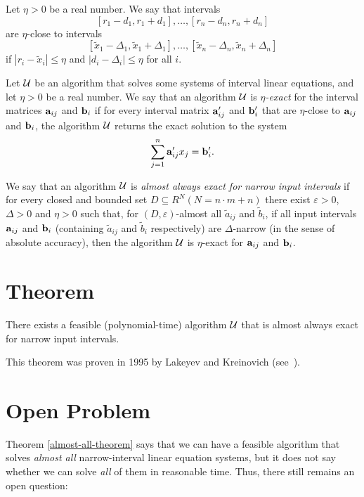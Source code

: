 \begin{definition}
{\rm Let $\eta>0$ be a real number.  We say that intervals
$$
  [r_1-d_1,r_1+d_1],\ldots,[r_n-d_n,r_n+d_n]
$$
are {$\eta$-close} to intervals
$$
  [\tilde x_1-\Delta_1,\tilde x_1+\Delta_1],\ldots,[\tilde x_n-\Delta_n,
   \tilde x_n+\Delta_n]
$$
if $|r_i-\tilde x_i|\leq\eta$ and 
$|d_i-\Delta_i|\leq\eta$ for all $i$.}
\end{definition}

\begin{definition}
{\rm Let $\cal U$ be an algorithm that solves some systems of interval linear
equations, and let $\eta>0$ be a real number.  We say that an algorithm 
$\cal U$ is {\em $\eta$-exact\/} for the interval matrices ${\bf a}_{ij}$ and
${\bf b}_i$ if for every interval matrix ${\bf a}_{ij}^\prime$ and 
${\bf b}_i^\prime$ that are $\eta$-close to ${\bf a}_{ij}$ and ${\bf b}_i$,
the algorithm $\cal U$ returns the exact solution to the system}
$$
  \sum_{j=1}^n {\bf a}_{ij}^\prime x_j = {\bf b}_i^\prime.
$$
\end{definition}

\begin{definition}
{\rm We say that an algorithm $\cal U$ is {\em almost always exact for narrow 
input intervals\/} if for every closed and bounded set $D\subseteq R^N
(N=n\cdot m+n)$ there exist $\varepsilon>0$, $\Delta>0$ and $\eta>0$ such
that, for $(D,\varepsilon)$-almost all $\tilde a_{ij}$ and $\tilde b_i$, if
all input intervals ${\bf a}_{ij}$ and ${\bf b}_i$
(containing $\tilde a_{ij}$ and $\tilde b_i$ respectively)
are $\Delta$-narrow (in the sense of absolute accuracy), then the
algorithm $\cal U$ is $\eta$-exact for ${\bf a}_{ij}$ and ${\bf b}_i$.}
\end{definition}

\section{Theorem}

\begin{theorem} \label{almost-all-theorem}
There exists a feasible (polynomial-time) algorithm $\cal U$ that is almost 
always exact for narrow input intervals.
\end{theorem}

\medskip

\noindent
This theorem was proven in 1995 by Lakeyev and Kreinovich
(see~\cite{Lakeyev1995}).

\section{Open Problem}
Theorem \ref{almost-all-theorem} says that we can have a feasible algorithm 
that solves {\em almost all\/} narrow-interval linear equation systems, but 
it does not say whether we can solve {\em all\/} of them in reasonable time.  
Thus, there still remains an open question:

